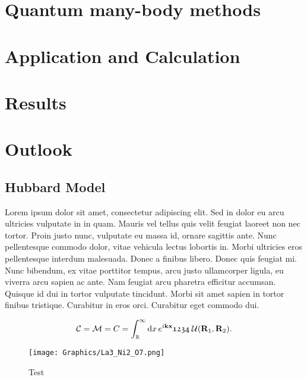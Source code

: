 \documentclass[12pt]{book}
\begin{document}
\cleardoublepage





\tableofcontents
\cleardoublepage

\setcounter{page}{0}






\chapter{Quantum many-body methods}

\chapter{Application and Calculation}

\chapter{Results}

\chapter{Outlook}

\section{Hubbard Model}

Lorem ipsum dolor sit amet, consectetur adipiscing elit. Sed in dolor eu arcu ultricies vulputate in in quam. Mauris vel tellus quis velit feugiat laoreet non nec tortor. Proin justo nunc, vulputate eu massa id, ornare sagittis ante. Nunc pellentesque commodo dolor, vitae vehicula lectus lobortis in. Morbi ultricies eros pellentesque interdum malesuada. Donec a finibus libero. Donec quis feugiat mi. Nunc bibendum, ex vitae porttitor tempus, arcu justo ullamcorper ligula, eu viverra arcu sapien ac ante. Nam feugiat arcu pharetra efficitur accumsan. Quisque id dui in tortor vulputate tincidunt. Morbi sit amet sapien in tortor finibus tristique. Curabitur in eros orci. Curabitur eget commodo dui.

\begin{align}
	\mathcal{C}=\mathcal{M}=C=\int_{\mathbb{R}}^{\infty}\mathrm{d}x\, e^{i\textbf{kx}}\mathfrak{1234}\;\mathcal{U}(\textbf{R}_1, \textbf{R}_2).
\end{align}

\begin{figure}[ht!]
	\centering
	\texttt{[image: Graphics/La3\_Ni2\_O7.png]}
	\caption{Test}
	\label{fig:test}
\end{figure}
\end{document}
